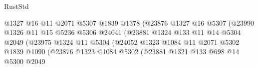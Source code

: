 \begin{lexlean}{RustStd}
\begin{coremodule}
                                          @1327
                                          @16
                                          @11
                                          @2071
                                          @5307
                                          @1839
                                          @1378
                                          (@23876
                                            @1327
                                            @16
                                            @5307
                                            (@23990
                                              @1326
                                              @11
                                              @15
                                              @5236
                                              @5306
                                              @24041
                                              (@23881
                                                @1324
                                                @133
                                                @11
                                                @14
                                                @5304
                                                @2049
                                                (@23975
                                                  @1324
                                                  @11
                                                  @5304
                                                  (@24052
                                                    @1323
                                                    @1084
                                                    @11
                                                    @2071
                                                    @5302
                                                    @1839
                                                    @1090
                                                    (@23876
                                                      @1323
                                                      @1084
                                                      @5302
                                                      (@23881
                                                        @1321
                                                        @133
                                                        @698
                                                        @14
                                                        @5300
                                                        @2049

\end{coremodule}
\end{lexlean}

